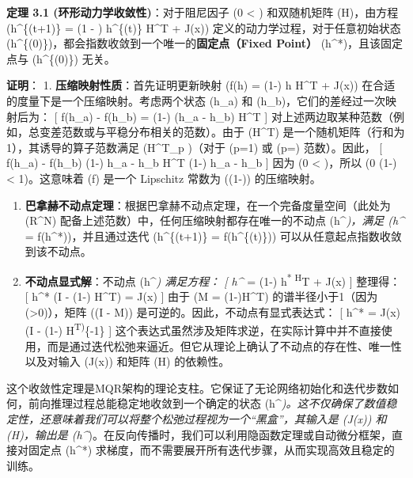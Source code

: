 \documentclass[
  12pt,
]{article}
\begin{document}
\textbf{定理 3.1 (环形动力学收敛性)}：对于阻尼因子 (0 \textless{}
\alpha {}) 和双随机矩阵 (H)，由方程 (h\^{}\{(t+1)\} = (1 - \alpha)
h\^{}\{(t)\} H\^{}T + \alpha J(x))
定义的动力学过程，对于任意初始状态
(h\^{}\{(0)\})，都会指数收敛到一个唯一的\textbf{固定点（Fixed Point）}
(h\^{}*)，且该固定点与 (h\^{}\{(0)\}) 无关。

\textbf{证明}： 1. \textbf{压缩映射性质}：首先证明更新映射 (f(h) =
(1-\alpha) h H\^{}T + \alpha J(x))
在合适的度量下是一个压缩映射。考虑两个状态 (h\_a) 和
(h\_b)，它们的差经过一次映射后为： {[} f(h\_a) - f(h\_b) = (1-\alpha)
(h\_a - h\_b) H\^{}T {]}
对上述两边取某种范数（例如，总变差范数或与平稳分布相关的范数）。由于
(H\^{}T) 是一个随机矩阵（行和为1），其诱导的算子范数满足
(\textbar H\^{}T\textbar\_p )（对于 (p=1) 或 (p=\infty)
范数）。因此， {[} \textbar f(h\_a) - f(h\_b)\textbar{} \leq (1-\alpha)
\textbar h\_a - h\_b\textbar{} \textbar H\^{}T\textbar{} \leq (1-\alpha)
\textbar h\_a - h\_b\textbar{} {]} 因为 (0 \textless{}
\alpha {})，所以 (0 \leq (1-\alpha) \textless{} 1)。这意味着 (f)
是一个 Lipschitz 常数为 ((1-\alpha)) 的压缩映射。

\begin{enumerate}
\def\labelenumi{\arabic{enumi}.}
\setcounter{enumi}{1}
\item
  \textbf{巴拿赫不动点定理}：根据巴拿赫不动点定理，在一个完备度量空间（此处为
  (R\^{}N) 配备上述范数）中，任何压缩映射都存在唯一的不动点
  (h\^{}\emph{)，满足 (h\^{}} = f(h\^{}*))，并且通过迭代 (h\^{}\{(t+1)\}
  = f(h\^{}\{(t)\})) 可以从任意起点指数收敛到该不动点。
\item
  \textbf{不动点显式解}：不动点 (h\^{}\emph{) 满足方程： {[} h\^{}} =
  (1-\alpha) h\textsuperscript{* H}T + \alpha J(x) {]}
  整理得： {[} h\^{}* (I - (1-\alpha) H\^{}T) = \alpha J(x)
  {]} 由于 (M = (1-\alpha)H\^{}T) 的谱半径小于1（因为
  (\alpha\textgreater0)），矩阵 ((I - M))
  是可逆的。因此，不动点有显式表达式： {[} h\^{}* =
  \alpha J(x) (I - (1-\alpha) H\textsuperscript{T)}\{-1\} {]}
  这个表达式虽然涉及矩阵求逆，在实际计算中并不直接使用，而是通过迭代松弛来逼近。但它从理论上确认了不动点的存在性、唯一性以及对输入
  (J(x)) 和矩阵 (H) 的依赖性。
\end{enumerate}

这个收敛性定理是MQR架构的理论支柱。它保证了无论网络初始化和迭代步数如何，前向推理过程总能稳定地收敛到一个确定的状态
(h\^{}\emph{)。这不仅确保了数值稳定性，还意味着我们可以将整个松弛过程视为一个``黑盒''，其输入是
(J(x)) 和 (H)，输出是
(h\^{}})。在反向传播时，我们可以利用隐函数定理或自动微分框架，直接对固定点
(h\^{}*) 求梯度，而不需要展开所有迭代步骤，从而实现高效且稳定的训练。
\end{document}
